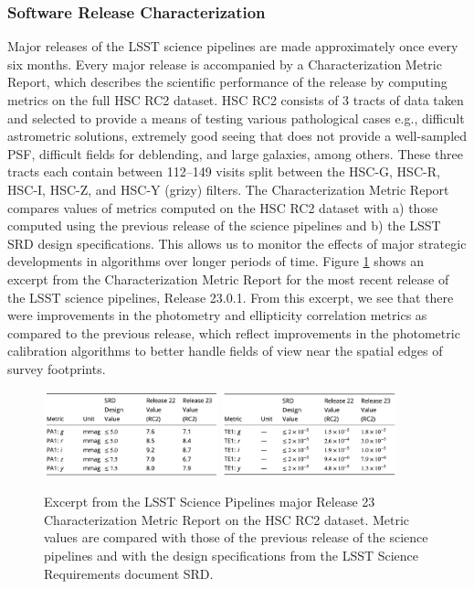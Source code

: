 \subsubsection{Software Release Characterization } \label{sssec:characterization}

Major releases of the LSST science pipelines are made approximately once every six months. 
Every major release is accompanied by a Characterization Metric Report, which describes the scientific performance of the release by computing \faro metrics on the full HSC RC2 dataset. 
HSC RC2 consists of 3 tracts of data taken and selected to provide a means of testing various pathological cases e.g., difficult astrometric solutions, extremely good seeing that does not provide a well-sampled PSF, difficult fields for deblending, and large galaxies, among others. 
These three tracts each contain between 112--149 visits split between the HSC-G, HSC-R, HSC-I, HSC-Z, and HSC-Y (grizy) filters.
The Characterization Metric Report compares values of metrics computed on the HSC RC2 dataset with a) those computed using the previous release of the science pipelines and b) the LSST SRD design specifications. 
This allows us to monitor the effects of major strategic developments in algorithms over longer periods of time. 
Figure \ref{fig:cmr_r23} shows an excerpt from the Characterization Metric Report \cite{dmtr-351} for the most recent release of the LSST science pipelines, Release 23.0.1.
From this excerpt, we see that there were improvements in the photometry and ellipticity correlation metrics as compared to the previous release, which reflect improvements in the photometric calibration algorithms to better handle fields of view near the spatial edges of survey footprints. 
\begin{figure}[!ht]

  \centering
  \includegraphics[width=0.45\textwidth]{figures/cmr_r23_photometric_metrics} 
  \hspace{0.5cm}
  \includegraphics[width=0.45\textwidth]{figures/cmr_r23_ellipticity_metrics}
  \par\medskip %
  \caption{Excerpt from the  LSST Science Pipelines major Release 23 Characterization Metric Report on the HSC RC2 dataset. Metric values are compared with those of the previous release of the science pipelines and with the design specifications from the LSST Science Requirements document SRD.}
  \label{fig:cmr_r23}
\end{figure}

